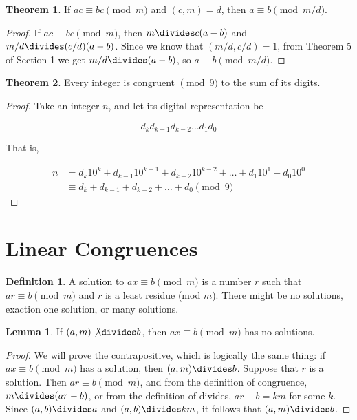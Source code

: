\documentclass{article}
\theoremstyle{definition} %
\newtheorem{theorem}{Theorem}[section] %
\theoremstyle{definition}
\theoremstyle{definition}
\newtheorem{lemma}{Lemma}[section]
\theoremstyle{definition}
\newtheorem{definition}{Definition}[section]
\begin{document}
  \begin{theorem}
    If $ac \equiv bc \pmod{m}$ and $(c, m) = d$, then $a \equiv b \pmod{m/d}$.
  \end{theorem}
  
  \begin{proof}
    If $ac \equiv bc \pmod{m}$, then $m \divides c(a - b)$ and $m/d \divides (c/d)(a - b)$.
    Since we know that $(m/d, c/d) = 1$, from Theorem 5 of Section 1 we get $m/d \divides (a - b)$,
    so $a \equiv b \pmod{m/d}$.
  \end{proof}
  
  \begin{theorem}
    Every integer is congruent $\pmod{9}$ to the sum of its digits.
  \end{theorem}
  
  \begin{proof}
    Take an integer $n$, and let its digital representation be

    \[ d_kd_{k-1}d_{k-2}\dots d_1d_0 \]

    That is,
    
    \begin{align*}
      n &= d_k10^k + d_{k-1}10^{k-1} + d_{k-2}10^{k-2} + \dots + d_1 10^1 + d_0 10^0 \\
        &\equiv d_k + d_{k-1} + d_{k-2} + \dots + d_0 \pmod{9}
    \end{align*}
  \end{proof}
  
  \section{Linear Congruences}
  
  \begin{definition}
    A solution to $ax \equiv b \pmod{m}$ is a number $r$ such that $ar \equiv b \pmod{m}$
    and $r$ is a least residue (mod $m$). There might be no solutions, exaction one solution,
    or many solutions.
  \end{definition}
  
  \begin{lemma}
    If $(a, m) \not\divides b$, then $ax \equiv b \pmod{m}$ has no solutions.
  \end{lemma}
  
  \begin{proof}
    We will prove the contrapositive, which is logically the same thing: if $ax \equiv b \pmod{m}$
    has a solution, then $(a, m) \divides b$. Suppose that $r$ is a solution. Then $ar \equiv b \pmod{m}$,
    and from the definition of congruence, $m \divides (ar - b)$, or from the definition of divides,
    $ar - b = km$ for some $k$. Since $(a, b) \divides a$ and $(a, b) \divides km$, it follows that
    $(a, m) \divides b$.
  \end{proof}
  
\end{document}
